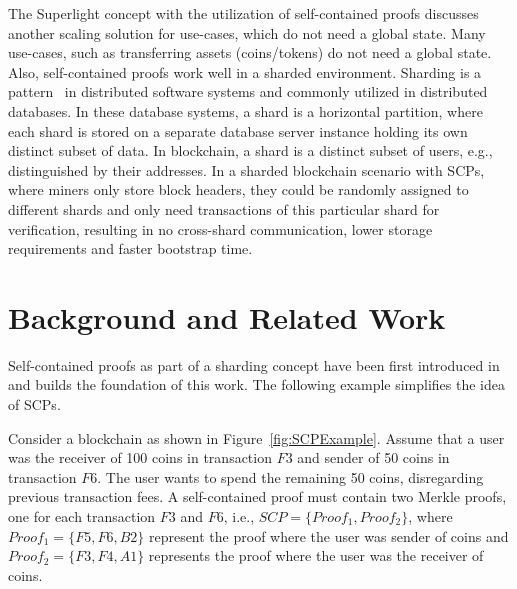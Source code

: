 \documentclass[conference]{IEEEtran}
\begin{document}
The Superlight concept with the utilization of self-contained proofs discusses another scaling solution for use-cases, which do not need a global state. Many use-cases, such as transferring assets (coins/tokens) do not need a global state. Also, self-contained proofs work well in a sharded environment. Sharding is a pattern~\cite{ShardingMS} in distributed software systems and commonly utilized in distributed databases. In these database systems, a shard is a horizontal partition, where each shard is stored on a separate database server instance holding its own distinct subset of data. In blockchain, a shard is a distinct subset of users, e.g., distinguished by their addresses. In a sharded blockchain scenario with SCPs, where miners only store block headers, they could be randomly assigned to different shards and only need transactions of this particular shard for verification, resulting in no cross-shard communication, lower storage requirements and faster bootstrap time.

\section{Background and Related Work}
Self-contained proofs as part of a sharding concept have been first introduced in~\cite{Blum18} and builds the foundation of this work. The following example simplifies the idea of SCPs.

Consider a blockchain as shown in Figure~\ref{fig:SCPExample}. Assume that a user was the receiver of 100 coins in transaction $F3$ and sender of 50 coins in transaction $F6$. The user wants to spend the remaining 50 coins, disregarding previous transaction fees. A self-contained proof must contain two Merkle proofs, one for each transaction $F3$ and $F6$, i.e., $SCP = \{Proof_1, Proof_2\}$, where $Proof_1 = \{F5, F6, B2\}$ represent the proof where the user was sender of coins and $Proof_2 = \{F3, F4, A1\}$ represents the proof where the user was the receiver of coins. 
\end{document}
